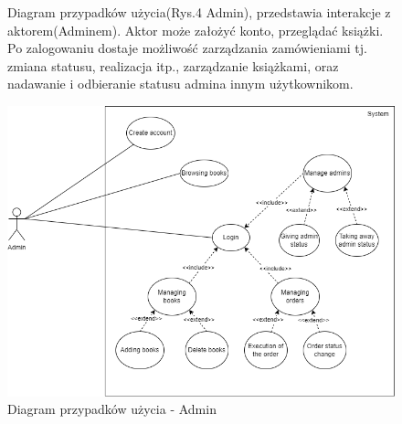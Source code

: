 \documentclass[]{article}
\begin{document}
\begin{figure}[ht]
	\begin{minipage}{\textwidth}
		Diagram przypadków użycia(Rys.4 Admin), przedstawia interakcje z aktorem(Adminem). Aktor może założyć konto, przeglądać książki. Po zalogowaniu dostaje możliwość zarządzania zamówieniami tj. zmiana statusu, realizacja itp., zarządzanie książkami, oraz nadawanie i odbieranie statusu admina innym użytkownikom.
	\end{minipage}
	\vspace{15pt}
	
	\centering
	\includegraphics[scale=0.50]{przyp_uz_admin.png}
	\caption{Diagram przypadków użycia - Admin}
\end{figure}
\end{document}
